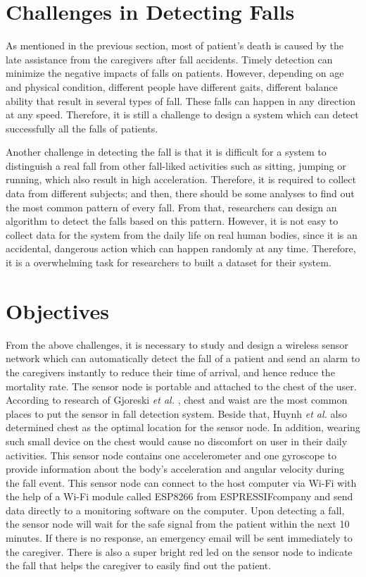 \documentclass[letterpaper,12pt,titlepage,oneside,final]{book}
\begin{document}
\section{Challenges in Detecting Falls}
As mentioned in the previous section, most of patient's death is caused by the late assistance from the caregivers after fall accidents. Timely detection can minimize the negative impacts of falls on patients. However, depending on age and physical condition, different people have different gaits, different balance ability that result in several types of fall. These falls can happen in any direction at any speed. Therefore, it is still a challenge to design a system which can detect successfully all the falls of patients. \par
Another challenge in detecting the fall is that it is difficult for a system to distinguish a real fall from other fall-liked activities such as sitting, jumping or running, which also result in high acceleration. Therefore, it is required to collect data from different subjects; and then, there should be some analyses to find out the most common pattern of every fall. From that, researchers can design an algorithm to detect the falls based on this pattern. However, it is not easy to collect data for the system from the daily life on real human bodies, since it is an accidental, dangerous action which can happen randomly at any time. Therefore, it is a overwhelming task for researchers to built a dataset for their system. 

\section{Objectives}
From the above challenges, it is necessary to study and design a wireless sensor network which can automatically detect the fall of a patient and send an alarm to the caregivers instantly to reduce their time of arrival, and hence reduce the mortality rate. The sensor node is portable and attached to the chest of the user. According to research of Gjoreski \textit{et al.} \cite{sensor_position1}, chest and waist are the most common places to put the sensor in fall detection system. Beside that, Huynh \textit{et al.} \cite{optimum_sensor_place} also determined chest as the optimal location for the sensor node. In addition, wearing such small device on the chest would cause no discomfort on user in their daily activities. This sensor node contains one accelerometer and one gyroscope to provide information about the body's acceleration and angular velocity during the fall event. This sensor node can connect to the host computer via Wi-Fi with the help of a Wi-Fi module called ESP8266 from ESPRESSIF\textregistered company and send data directly to a monitoring software on the computer. Upon detecting a fall, the sensor node will wait for the safe signal from the patient within the next 10 minutes. If there is no response, an emergency email will be sent immediately to the caregiver. There is also a super bright red led on the sensor node to indicate the fall that helps the caregiver to easily find out the patient. 
\end{document}
